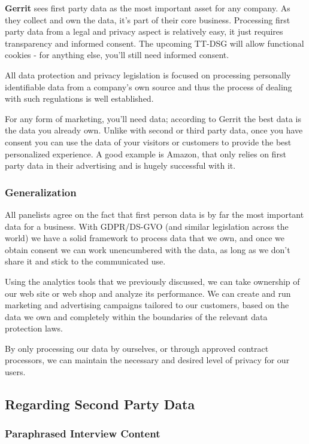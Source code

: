 \textbf{Gerrit} sees first party data as the most important asset for any company. As they collect and own the data, it's part of their core business. Processing first party data from a legal and privacy aspect is relatively easy, it just requires transparency and informed consent. The upcoming TT-DSG will allow functional cookies - for anything else, you'll still need informed consent. 

All data protection and privacy legislation is focused on processing personally identifiable data from a company's own source and thus the process of dealing with such regulations is well established.

For any form of marketing, you'll need data; according to Gerrit the best data is the data you already own. Unlike with second or third party data, once you have consent you can use the data of your visitors or customers to provide the best personalized experience. A good example is Amazon, that only relies on first party data in their advertising and is hugely successful with it.

\subsubsection{Generalization}

All panelists agree on the fact that first person data is by far the most important data for a business. With GDPR/DS-GVO (and similar legislation across the world) we have a solid framework to process data that we own, and once we obtain consent we can work unencumbered with the data, as long as we don't share it and stick to the communicated use.

Using the analytics tools that we previously discussed, we can take ownership of our web site or web shop and analyze its performance. We can create and run marketing and advertising campaigns tailored to our customers, based on the data we own and completely within the boundaries of the relevant data protection laws.

By only processing our data by ourselves, or through approved contract processors, we can maintain the necessary and desired level of privacy for our users.

\subsection{Regarding Second Party Data}

\subsubsection{Paraphrased Interview Content}

